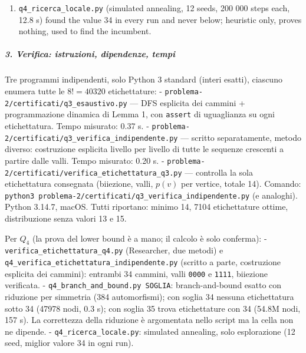 \documentclass[11pt,a4paper]{article}
\begin{document}
\begin{enumerate}
  minimising \(\sum_{v\in U}\max(1,a(v)+d(v))\) over nonnegative \(d\)
  with \(\sum d=E(U)\) gives
  \(\sum_{v\in U,a(v)\ge1}a(v)+\max(\#\{v\in U:a(v)=0\},E(U))\), so
  \(\text{LB}=\sum_{v\in S}p(v)+\sum_{v\in U,a(v)\ge1}a(v)+\max(\#\{a=0\},E(U))\)
  is a valid lower bound for every completion; a node is pruned iff
  \(\text{LB}\ge T\). Results: \(T=34\): \textbf{0 labellings found}, 47
  978 nodes, 0.3 s. \(T=35\): 19 525 440 labellings with exactly 34
  reached by the reduced search, 54 814 700 nodes, 156.8 s (shows the
  pruning is not over-aggressive at the optimum). Sanity check on
  \(Q_3\) (same code with \texttt{D\ =\ 3}): \(T=13\): 0 found;
  \(T=14\): 0 found (83 nodes); \(T=15\): 148 found, and
  \(148\cdot48=7104\) is exactly the known number of optimal labellings
  of \(Q_3\) (\(|\mathrm{Aut}(Q_3)|=48\)). This search is a confirmation
  only; the proof of \(U(Q_4)\ge34\) is the hand argument above.
\item
  \texttt{q4\_ricerca\_locale.py} (simulated annealing, 12 seeds, 200
  000 steps each, 12.8 s) found the value 34 in every run and never
  below; heuristic only, proves nothing, used to find the incumbent.
\end{enumerate}

\subparagraph{3. Verifica: istruzioni, dipendenze,
tempi}\label{verifica-istruzioni-dipendenze-tempi}

Tre programmi indipendenti, solo Python 3 standard (interi esatti),
ciascuno enumera tutte le \(8!=40320\) etichettature: -
\texttt{problema-2/certificati/q3\_esaustivo.py} --- DFS esplicita dei
cammini + programmazione dinamica di Lemma 1, con \texttt{assert} di
uguaglianza su ogni etichettatura. Tempo misurato: 0.37 s. -
\texttt{problema-2/certificati/q3\_verifica\_indipendente.py} ---
scritto separatamente, metodo diverso: costruzione esplicita livello per
livello di tutte le sequenze crescenti a partire dalle valli. Tempo
misurato: 0.20 s. -
\texttt{problema-2/certificati/verifica\_etichettatura\_q3.py} ---
controlla la sola etichettatura consegnata (biiezione, valli, \(p(v)\)
per vertice, totale 14). Comando:
\texttt{python3\ problema-2/certificati/q3\_verifica\_indipendente.py}
(e analoghi). Python 3.14.7, macOS. Tutti riportano: minimo 14, 7104
etichettature ottime, distribuzione senza valori 13 e 15.

Per \(Q_4\) (la prova del lower bound è a mano; il calcolo è solo
conferma): - \texttt{verifica\_etichettatura\_q4.py} (Researcher, due
metodi) e \texttt{q4\_verifica\_etichettatura\_indipendente.py} (scritto
a parte, costruzione esplicita dei cammini): entrambi 34 cammini, valli
\texttt{0000} e \texttt{1111}, biiezione verificata. -
\texttt{q4\_branch\_and\_bound.py\ SOGLIA}: branch-and-bound esatto con
riduzione per simmetria (384 automorfismi); con soglia 34 nessuna
etichettatura sotto 34 (47978 nodi, 0.3 s); con soglia 35 trova
etichettature con 34 (54.8M nodi, 157 s). La correttezza della riduzione
è argomentata nello script ma la cella non ne dipende. -
\texttt{q4\_ricerca\_locale.py}: simulated annealing, solo esplorazione
(12 seed, miglior valore 34 in ogni run).
\end{document}
